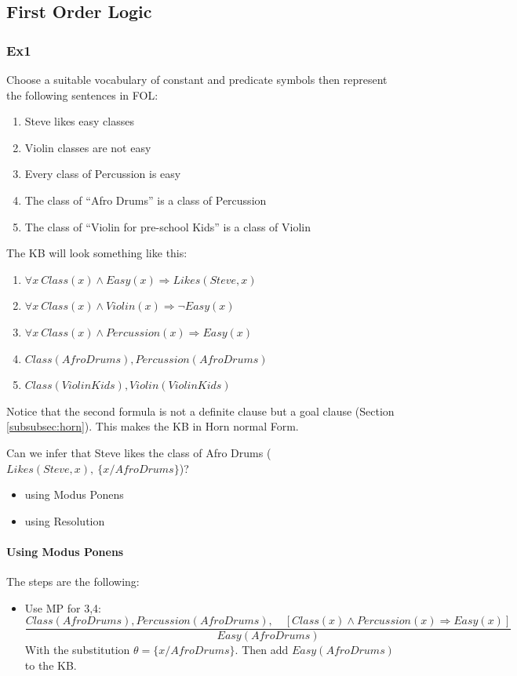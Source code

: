 \documentclass[10pt,a4paper]{article}
\begin{document}
\begin{itemize}
\subsection{First Order Logic}

\subsubsection{Ex1}
Choose a suitable vocabulary of constant and predicate symbols then represent the following sentences in FOL:
\begin{enumerate}
\item Steve likes easy classes
\item Violin classes are not easy
\item Every class of Percussion is easy
\item The class of “Afro Drums” is a class of Percussion
\item The class of “Violin for pre-school Kids” is a class of Violin
\end{enumerate}
The KB will look something like this:
\begin{enumerate}

\item $\forall x\ Class(x)\wedge Easy(x) \Rightarrow Likes(Steve,x)$
\item $\forall x\ Class(x)\wedge Violin(x) \Rightarrow \neg Easy(x)$
\item $\forall x\ Class(x)\wedge Percussion(x) \Rightarrow Easy(x)$
\item $Class(AfroDrums), Percussion(AfroDrums)$
\item $Class(ViolinKids), Violin(ViolinKids)$

\end{enumerate}
Notice that the second formula is not a definite clause but a goal clause (Section \ref{subsubsec:horn}). This makes the KB in Horn normal Form.


Can we infer that Steve likes the class of Afro Drums ($Likes(Steve,x),\ \{x/AfroDrums\}$)?
\begin{itemize}
\item using Modus Ponens
\item using Resolution
\end{itemize} 


\paragraph{Using Modus Ponens}
The steps are the following:
\begin{itemize}
\item Use MP for 3,4:
\[\frac{Class(AfroDrums), Percussion(AfroDrums),\quad [Class(x)\wedge Percussion(x) \Rightarrow Easy(x)]}{Easy(AfroDrums)}\]
With the substitution $\theta=\lbrace x/AfroDrums \rbrace$. Then add  $Easy(AfroDrums)$ to the KB.


\end{itemize}
\end{itemize}
\end{document}
